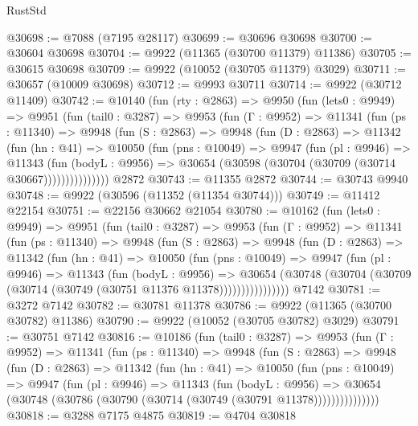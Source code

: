 \begin{lexlean}{RustStd}
\begin{coremodule}
@30698 := @7088 (@7195 @28117)
@30699 := @30696 @30698
@30700 := @30604 @30698
@30704 := @9922 (@11365 (@30700 @11379) @11386)
@30705 := @30615 @30698
@30709 := @9922 (@10052 (@30705 @11379) @3029)
@30711 := @30657 (@10009 @30698)
@30712 := @9993 @30711
@30714 := @9922 (@30712 @11409)
@30742 := @10140
    (fun (rty : @2863) =>
    @9950
      (fun (lets0 : @9949) =>
      @9951
        (fun (tail0 : @3287) =>
        @9953
          (fun (Γ : @9952) =>
          @11341
            (fun (ps : @11340) =>
            @9948
              (fun (S : @2863) =>
              @9948
                (fun (D : @2863) =>
                @11342
                  (fun (hn : @41) =>
                  @10050
                    (fun (pns : @10049) =>
                    @9947
                      (fun (pl : @9946) =>
                      @11343
                        (fun (bodyL : @9956) =>
                        @30654 (@30598 (@30704 (@30709 (@30714 @30667)))))))))))))))
    @2872
@30743 := @11355 @2872
@30744 := @30743 @9940
@30748 := @9922 (@30596 (@11352 (@11354 @30744)))
@30749 := @11412 @22154
@30751 := @22156 @30662 @21054
@30780 := @10162
    (fun (lets0 : @9949) =>
    @9951
      (fun (tail0 : @3287) =>
      @9953
        (fun (Γ : @9952) =>
        @11341
          (fun (ps : @11340) =>
          @9948
            (fun (S : @2863) =>
            @9948
              (fun (D : @2863) =>
              @11342
                (fun (hn : @41) =>
                @10050
                  (fun (pns : @10049) =>
                  @9947
                    (fun (pl : @9946) =>
                    @11343
                      (fun (bodyL : @9956) =>
                      @30654
                        (@30748
                          (@30704 (@30709 (@30714 (@30749 (@30751 @11376 @11378))))))))))))))))
    @7142
@30781 := @3272 @7142
@30782 := @30781 @11378
@30786 := @9922 (@11365 (@30700 @30782) @11386)
@30790 := @9922 (@10052 (@30705 @30782) @3029)
@30791 := @30751 @7142
@30816 := @10186
    (fun (tail0 : @3287) =>
    @9953
      (fun (Γ : @9952) =>
      @11341
        (fun (ps : @11340) =>
        @9948
          (fun (S : @2863) =>
          @9948
            (fun (D : @2863) =>
            @11342
              (fun (hn : @41) =>
              @10050
                (fun (pns : @10049) =>
                @9947
                  (fun (pl : @9946) =>
                  @11343
                    (fun (bodyL : @9956) =>
                    @30654 (@30748 (@30786 (@30790 (@30714 (@30749 (@30791 @11378)))))))))))))))
@30818 := @3288 @7175 @4875
@30819 := @4704 @30818

\end{coremodule}
\end{lexlean}
